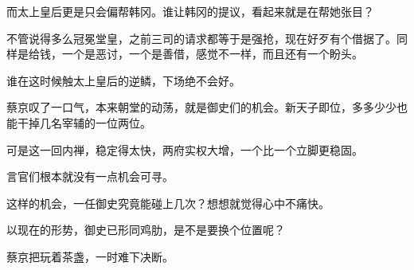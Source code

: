 而太上皇后更是只会偏帮韩冈。谁让韩冈的提议，看起来就是在帮她张目？

不管说得多么冠冕堂皇，之前三司的请求都等于是强抢，现在好歹有个借据了。同样是给钱，一个是恶讨，一个是善借，感觉不一样，而且还有一个盼头。

谁在这时候触太上皇后的逆鳞，下场绝不会好。

蔡京叹了一口气，本来朝堂的动荡，就是御史们的机会。新天子即位，多多少少也能干掉几名宰辅的一位两位。

可是这一回内禅，稳定得太快，两府实权大增，一个比一个立脚更稳固。

言官们根本就没有一点机会可寻。

这样的机会，一任御史究竟能碰上几次？想想就觉得心中不痛快。

以现在的形势，御史已形同鸡肋，是不是要换个位置呢？

蔡京把玩着茶盏，一时难下决断。

